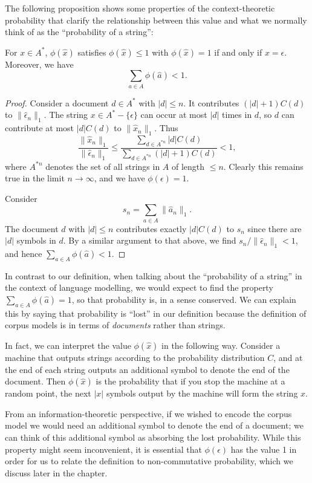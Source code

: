 The following proposition shows some properties of the context-theoretic probability that clarify the relationship between this value and what we normally think of as the ``probability of a string'':

\begin{prop}
For $x \in A^*$, $\phi(\hat{x})$ satisfies $\phi(\hat{x}) \le 1$ with $\phi(\hat{x}) = 1$ if and only if $x = \epsilon$. Moreover, we have
$$\sum_{a \in A} \phi(\hat{a}) < 1.$$
\end{prop}

\begin{proof}
Consider a document $d \in A^*$ with $|d| \le n$. It contributes $(|d|+1)C(d)$ to $\|\hat{\epsilon}_n\|_1$. The string $x \in A^* - \{\epsilon\}$ can occur at most $|d|$ times in $d$, so $d$ can contribute at most $|d|C(d)$ to $\|\hat{x}_n\|_1$. Thus
$$\frac{\|\hat{x}_n\|_1}{\|\hat{\epsilon}_n\|_1} \le \frac{\sum_{d\in A^{*n}}|d|C(d)}{\sum_{d\in A^{*n}}(|d|+1)C(d)} < 1,$$
where $A^{*n}$ denotes the set of all strings in $A$ of length $\le n$. Clearly this remains true in the limit $n \rightarrow \infty$, and we have $\phi(\epsilon) = 1$.

Consider $$s_n = \sum_{a \in A} \|\hat{a}_n\|_1.$$ The document $d$ with $|d| \le n$ contributes exactly $|d|C(d)$ to $s_n$ since there are $|d|$ symbols in $d$. By a similar argument to that above, we find $s_n/\|\hat{\epsilon}_n\|_1 < 1$, and hence $\sum_{a \in A} \phi(\hat{a}) < 1$.
\end{proof}

In contrast to our definition, when talking about the ``probability of a string'' in the context of language modelling, we would expect to find the property $\sum_{a \in A} \phi(\hat{a}) = 1$, so that probability is, in a sense conserved. We can explain this by saying that probability is ``lost'' in our definition because the definition of corpus models is in terms of \emph{documents} rather than strings. 

In fact, we can interpret the value $\phi(\hat{x})$ in the following way. Consider a machine that outputs strings according to the probability distribution $C$, and at the end of each string outputs an additional symbol to denote the end of the document. Then $\phi(\hat{x})$ is the probability that if you stop the machine at a random point, the next $|x|$ symbols output by the machine will form the string $x$.

From an information-theoretic perspective, if we wished to encode the corpus model we would need an additional symbol to denote the end of a document; we can think of this additional symbol as absorbing the lost probability. While this property might seem inconvenient, it is essential that $\phi(\epsilon)$ has the value 1 in order for us to relate the definition to non-commutative probability, which we discuss later in the chapter.

